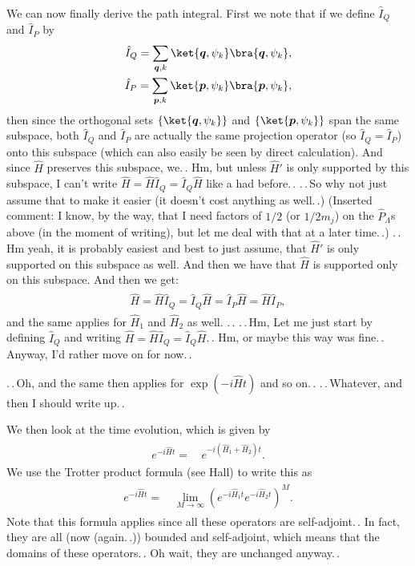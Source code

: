 \documentclass{report}
\begin{document}
We can now finally derive the path integral. First we note that if we define $\hat I_Q$ and $\hat I_P$ by
\begin{align}
\begin{aligned}
	\hat I_Q = \sum_{\boldsymbol{q}, k} \ket{\boldsymbol{q}, \psi_{k}}\bra{\boldsymbol{q}, \psi_{k}},
	\\
	\hat I_P = \sum_{\boldsymbol{p}, k} \ket{\boldsymbol{p}, \psi_{k}}\bra{\boldsymbol{p}, \psi_{k}},
\end{aligned}
\end{align}
then since the orthogonal sets $\{\ket{\boldsymbol{q}, \psi_k}\}$ and $\{\ket{\boldsymbol{p}, \psi_k}\}$ span the same subspace, both $\hat I_Q$ and $\hat I_P$ are actually the same projection operator (so $\hat I_Q = \hat I_P$) onto this subspace (which can also easily be seen by direct calculation). And since $\hat H$ preserves this subspace, we.\,. Hm, but unless $\hat H'$ is only supported by this subspace, I can't write $\hat H = \hat H \hat I_Q = \hat I_Q \hat H$ like a had before.\,. .\,.\,So why not just assume that to make it easier (it doesn't cost anything as well.\,.) (Inserted comment: I know, by the way, that I need factors of $1/2$ (or $1/2m_j$) on the $\hat P_\Lambda$s above (in the moment of writing), but let me deal with that at a later time.\,.) .\,.\,Hm yeah, it is probably easiest and best to just assume, that $\hat H'$ is only supported on this subspace as well. And then we have that $\hat H$ is supported only on this subspace. And then we get:
\begin{align}
\begin{aligned}
	\hat H = \hat H \hat I_Q = \hat I_Q \hat H = \hat I_P \hat H = \hat H \hat I_P,
\end{aligned}
\end{align}
and the same applies for $\hat H_1$ and $\hat H_2$ as well. .\,. .\,.\,Hm, Let me just start by defining $\hat I_Q$ and writing  $\hat H = \hat H \hat I_Q = \hat I_Q \hat H$.\,. Hm, or maybe this way was fine.\,. Anyway, I'd rather move on for now.\,. 

.\,.\,Oh, and the same then applies for $\exp(-i \hat H t)$ and so on.\,. .\,.\,Whatever, and then I should write up.\,.

We then look at the time evolution, which is given by
\begin{align}
\begin{aligned}
	e^{-i \hat H t} =&\, e^{-i (\hat H_1 + \hat H_2) t}.
\end{aligned}
\end{align}
We use the Trotter product formula (see Hall) to write this as 
\begin{align}
\begin{aligned}
	e^{-i \hat H t} =&\, \lim_{M\to\infty} (e^{-i \hat H_1 t} e^{-i \hat H_2 t})^M.
\end{aligned}
\end{align}
Note that this formula applies since all these operators are self-adjoint.\,. In fact, they are all (now (again.\,.)) bounded and self-adjoint, which means that the domains of these operators.\,. Oh wait, they are unchanged anyway.\,. 
\end{document}
